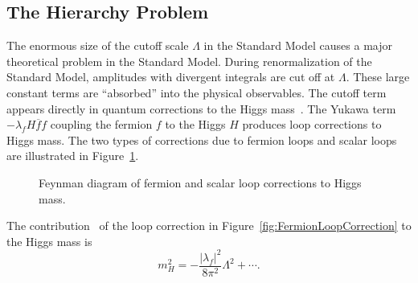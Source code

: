 \subsection{The Hierarchy Problem}
The enormous size of the cutoff scale $\Lambda$ in the Standard Model causes a
major theoretical problem in the Standard Model.  During renormalization of the
Standard Model, amplitudes with divergent integrals are cut off at $\Lambda$.
These large constant terms are ``absorbed'' into the physical observables.  The
cutoff term appears directly in quantum corrections to the Higgs
mass~\cite{Martin:1997um}.  The Yukawa term $-\lambda_f H \overline f f$
coupling the fermion $f$ to the Higgs $H$ produces loop corrections to Higgs
mass.  The two types of corrections due to fermion loops and scalar loops are
illustrated in Figure~\ref{fig:HiggsMassLoopCorrections}.
\begin{figure}
  \centering
  \hspace{15mm}
  \caption[Loop corrections to Higgs mass]{Feynman diagram of
  fermion  and scalar
   loop corrections to Higgs mass.}
  \label{fig:HiggsMassLoopCorrections}
\end{figure}
The contribution~\cite{Martin:1997um}  of the loop correction in
Figure~\ref{fig:FermionLoopCorrection} to the Higgs mass is
\begin{equation}
  m^2_H = -\frac{|\lambda_f|^2}{8 \pi^2} \Lambda^2 + \cdots.
  \label{eq:HiggsMassCorrection}
\end{equation}
